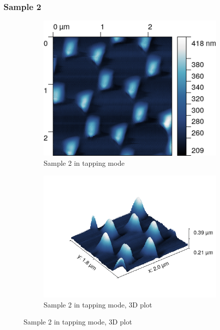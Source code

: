 \documentclass[11pt,a4paper]{article}
\begin{document}
\subsubsection{Sample 2}
\begin{figure}[H]
\centering
\begin{subfigure}[b]{0.45\textwidth}
\includegraphics[width=\textwidth]{tm_sample2}
\caption{Sample 2 in tapping mode}
\label{fig:}
\end{subfigure}
\begin{subfigure}[b]{0.45\textwidth}
\includegraphics[width=\textwidth]{tm_sample2_3D}
\caption{Sample 2 in tapping mode, 3D plot}
\label{fig:}
\end{subfigure}
\end{figure}
\end{document}
